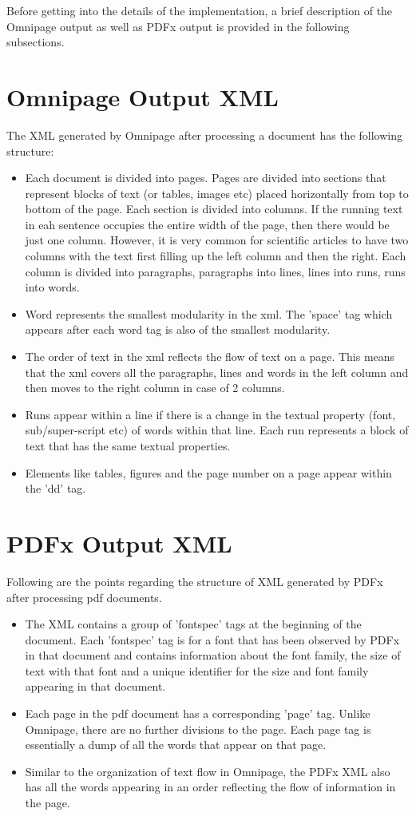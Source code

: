 Before getting into the details of the implementation, a brief description of the Omnipage output as well as PDFx output is provided in the following subsections.

\section{Omnipage Output XML}
The XML generated by Omnipage after processing a document has the following structure:
\begin{itemize}
\item Each document is divided into pages.
  Pages are divided into sections that represent blocks of text (or tables, images etc) placed horizontally from top to bottom of the page.
  Each section is divided into columns.
  If the running text in eah sentence occupies the entire width of the page, then there would be just one column.
  However, it is very common for scientific articles to have two columns with the text first filling up the left column and then the right.
  Each column is divided into paragraphs, paragraphs into lines, lines into runs, runs into words.
\item Word represents the smallest modularity in the xml.
  The 'space' tag which appears after each word tag is also of the smallest modularity.
\item The order of text in the xml reflects the flow of text on a page.
  This means that the xml covers all the paragraphs, lines and words in the left column and then moves to the right column in case of 2 columns.
\item Runs appear within a line if there is a change in the textual property (font, sub/super-script etc) of words within that line.
  Each run represents a block of text that has the same textual properties.
\item Elements like tables, figures and the page number on a page appear within the 'dd' tag.
\end{itemize}

\section{PDFx Output XML}
Following are the points regarding the structure of XML generated by PDFx after processing pdf documents.
\begin{itemize}
\item The XML contains a group of 'fontspec' tags at the beginning of the document.
  Each 'fontspec' tag is for a font that has been observed by PDFx in that document and contains information about the font family, the size of text with that font and a unique identifier for the size and font family appearing in that document.
\item Each page in the pdf document has a corresponding 'page' tag. Unlike Omnipage, there are no further divisions to the page.
  Each page tag is essentially a dump of all the words that appear on that page.
\item Similar to the organization of text flow in Omnipage, the PDFx XML also has all the words appearing in an order reflecting the flow of information in the page.
\end{itemize}

